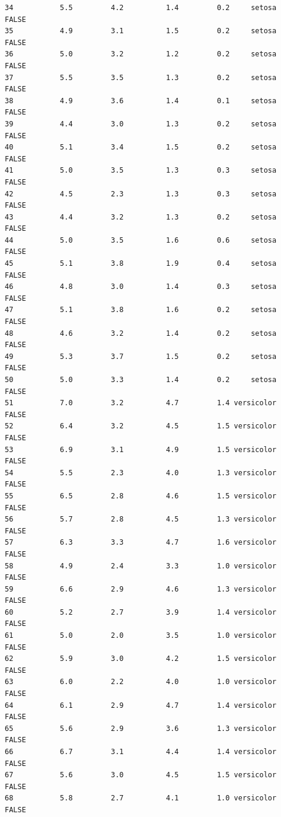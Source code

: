 \documentclass[
  letterpaper,
  DIV=11,
  numbers=noendperiod]{scrreprt}
\begin{document}
\begin{verbatim}
34           5.5         4.2          1.4         0.2     setosa     FALSE
35           4.9         3.1          1.5         0.2     setosa     FALSE
36           5.0         3.2          1.2         0.2     setosa     FALSE
37           5.5         3.5          1.3         0.2     setosa     FALSE
38           4.9         3.6          1.4         0.1     setosa     FALSE
39           4.4         3.0          1.3         0.2     setosa     FALSE
40           5.1         3.4          1.5         0.2     setosa     FALSE
41           5.0         3.5          1.3         0.3     setosa     FALSE
42           4.5         2.3          1.3         0.3     setosa     FALSE
43           4.4         3.2          1.3         0.2     setosa     FALSE
44           5.0         3.5          1.6         0.6     setosa     FALSE
45           5.1         3.8          1.9         0.4     setosa     FALSE
46           4.8         3.0          1.4         0.3     setosa     FALSE
47           5.1         3.8          1.6         0.2     setosa     FALSE
48           4.6         3.2          1.4         0.2     setosa     FALSE
49           5.3         3.7          1.5         0.2     setosa     FALSE
50           5.0         3.3          1.4         0.2     setosa     FALSE
51           7.0         3.2          4.7         1.4 versicolor     FALSE
52           6.4         3.2          4.5         1.5 versicolor     FALSE
53           6.9         3.1          4.9         1.5 versicolor     FALSE
54           5.5         2.3          4.0         1.3 versicolor     FALSE
55           6.5         2.8          4.6         1.5 versicolor     FALSE
56           5.7         2.8          4.5         1.3 versicolor     FALSE
57           6.3         3.3          4.7         1.6 versicolor     FALSE
58           4.9         2.4          3.3         1.0 versicolor     FALSE
59           6.6         2.9          4.6         1.3 versicolor     FALSE
60           5.2         2.7          3.9         1.4 versicolor     FALSE
61           5.0         2.0          3.5         1.0 versicolor     FALSE
62           5.9         3.0          4.2         1.5 versicolor     FALSE
63           6.0         2.2          4.0         1.0 versicolor     FALSE
64           6.1         2.9          4.7         1.4 versicolor     FALSE
65           5.6         2.9          3.6         1.3 versicolor     FALSE
66           6.7         3.1          4.4         1.4 versicolor     FALSE
67           5.6         3.0          4.5         1.5 versicolor     FALSE
68           5.8         2.7          4.1         1.0 versicolor     FALSE

\end{verbatim}
\end{document}
